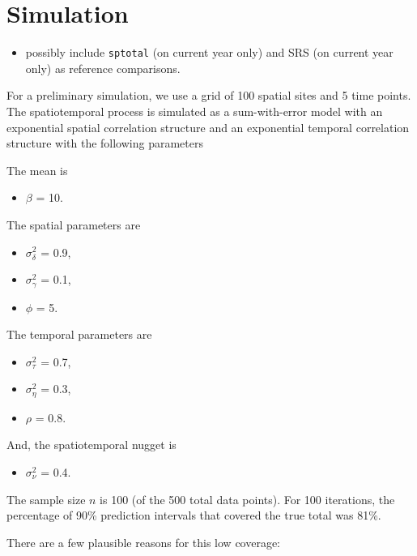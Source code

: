 \documentclass[]{interact}
\theoremstyle{plain}%
\theoremstyle{definition}
\theoremstyle{remark}
\def\tightlist{}
\begin{document}
\section{Simulation} \label{section:Simulation}

\begin{itemize}
\tightlist
\item
  possibly include \texttt{sptotal} (on current year only) and SRS (on
  current year only) as reference comparisons.
\end{itemize}

For a preliminary simulation, we use a grid of 100 spatial sites and 5
time points. The spatiotemporal process is simulated as a sum-with-error
model with an exponential spatial correlation structure and an
exponential temporal correlation structure with the following parameters

The mean is

\begin{itemize}
\tightlist
\item
  \(\beta\) = 10.
\end{itemize}

The spatial parameters are

\begin{itemize}
\tightlist
\item
  \(\sigma^2_{\delta}\) = 0.9,
\item
  \(\sigma^2_{\gamma}\) = 0.1,
\item
  \(\phi\) = 5.
\end{itemize}

The temporal parameters are

\begin{itemize}
\tightlist
\item
  \(\sigma^2_{\tau}\) = 0.7,
\item
  \(\sigma^2_{\eta}\) = 0.3,
\item
  \(\rho\) = 0.8.
\end{itemize}

And, the spatiotemporal nugget is

\begin{itemize}
\tightlist
\item
  \(\sigma^2_{\nu}\) = 0.4.
\end{itemize}

The sample size \(n\) is 100 (of the 500 total data points). For 100
iterations, the percentage of 90\% prediction intervals that covered the
true total was 81\%.

There are a few plausible reasons for this low coverage:
\end{document}
